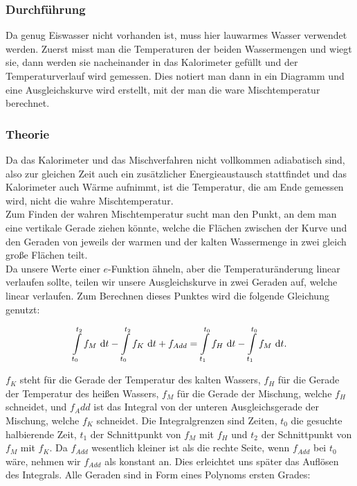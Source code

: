 \documentclass[11pt,a4paper]{article}
\begin{document}
\subsubsection{Durchf\"uhrung}

Da genug Eiswasser nicht vorhanden ist, muss hier lauwarmes Wasser verwendet werden. Zuerst misst man die Temperaturen der beiden Wassermengen und wiegt sie, dann werden sie nacheinander in das Kalorimeter gef\"ullt und der Temperaturverlauf wird gemessen. Dies notiert man dann in ein Diagramm und eine Ausgleichskurve wird erstellt, mit der man die ware Mischtemperatur berechnet.

\subsubsection{Theorie}

Da das Kalorimeter und das Mischverfahren nicht vollkommen adiabatisch sind, also zur gleichen Zeit auch ein zus\"atzlicher Energieaustausch stattfindet und das Kalorimeter auch W\"arme aufnimmt, ist die Temperatur, die am Ende gemessen wird, nicht die wahre Mischtemperatur.\\
Zum Finden der wahren Mischtemperatur sucht man den Punkt, an dem man eine vertikale Gerade ziehen k\"onnte, welche die Fl\"achen zwischen der Kurve und den Geraden von jeweils der warmen und der kalten Wassermenge in zwei gleich gro\ss e Fl\"achen teilt.\\
Da unsere Werte einer $e$-Funktion \"ahneln, aber die Temperatur\"anderung linear verlaufen sollte, teilen wir unsere Ausgleichskurve in zwei Geraden auf, welche linear verlaufen.
Zum Berechnen dieses Punktes wird die folgende Gleichung genutzt:

\begin{equation}
\int\displaylimits_{t_{0}}^{t_2} f_M\ \mathrm{d}t - \int\displaylimits_{t_{0}}^{t_2} f_K\ \mathrm{d}t + f_{Add}= \int\displaylimits_{t_1}^{t_{0}} f_H\ \mathrm{d}t - \int\displaylimits_{t_1}^{t_{0}} f_M\ \mathrm{d}t.\label{bigint1}
\end{equation}

$f_K$ steht f\"ur die Gerade der Temperatur des kalten Wassers, $f_H$ f\"ur die Gerade der Temperatur des hei\ss en Wassers, $f_M$ f\"ur die Gerade der Mischung, welche $f_H$ schneidet, und $f_Add$ ist das Integral von der unteren Ausgleichsgerade der Mischung, welche $f_K$ schneidet. Die Integralgrenzen sind Zeiten, $t_0$ die gesuchte halbierende Zeit, $t_1$ der Schnittpunkt von $f_M$ mit $f_H$ und $t_2$ der Schnittpunkt von $f_M$ mit $f_K$. Da $f_{Add}$ wesentlich kleiner ist als die rechte Seite, wenn $f_{Add}$ bei $t_0$ w\"are, nehmen wir $f_{Add}$ als konstant an. Dies erleichtet uns sp\"ater das Aufl\"osen des Integrals. Alle Geraden sind in Form eines Polynoms ersten Grades:
\end{document}
